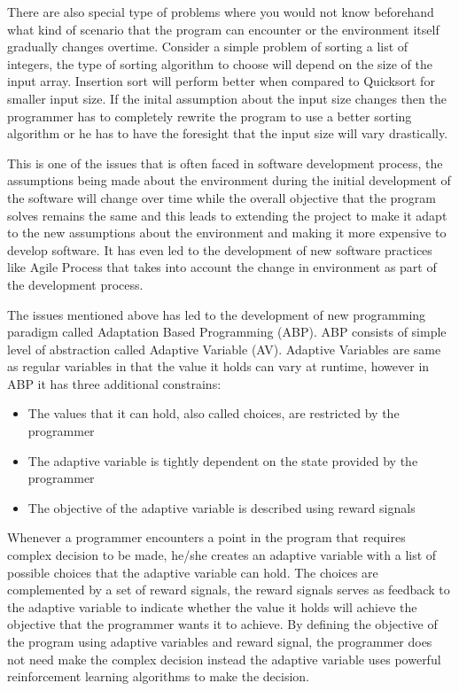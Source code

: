 \documentclass[conference]{IEEEtran}
\begin{document}
There are also special type of problems where you would not know beforehand what kind of scenario that
the program can encounter or the environment itself gradually changes overtime. Consider a simple problem
of sorting a list of integers, the type of sorting algorithm to choose will depend on the size of the input array.
Insertion sort will perform better when compared to Quicksort for smaller input size. If the inital
assumption about the input size changes then the programmer has to completely rewrite the program to use
a better sorting algorithm or he has to have the foresight that the input size will vary drastically.

This is one of the issues that is often faced in software development process, the assumptions
being made about the environment during the initial development of the software will
change over time while the overall objective that the program solves remains the same
and this leads to extending the project to make it adapt to the new assumptions
about the environment and making it more expensive to develop software.
It has even led to the development of new software practices like Agile Process that takes into
account the change in environment as part of the development process.

The issues mentioned above has led to the development of new programming paradigm called
Adaptation Based Programming (ABP). ABP consists of simple level of abstraction called Adaptive Variable (AV).
Adaptive Variables are same as regular variables in that the value it holds can vary at runtime, however in
ABP it has three additional constrains:
\begin{itemize}
  \item The values that it can hold, also called choices, are restricted by the programmer
  \item The adaptive variable is tightly dependent on the state provided by the programmer
  \item The objective of the adaptive variable is described using reward signals %
\end{itemize}


Whenever a programmer encounters a point in the program that requires complex decision
to be made, he/she creates an adaptive variable with a list of possible choices that the adaptive variable can
hold. The choices are complemented by a set of reward signals, the reward signals serves
as feedback to the adaptive variable to indicate whether the value it holds will achieve the objective
that the programmer wants it to achieve. By defining the objective of the program using adaptive
variables and reward signal, the programmer does not need make the complex decision instead the
adaptive variable uses powerful reinforcement learning algorithms to make the decision.
\end{document}
